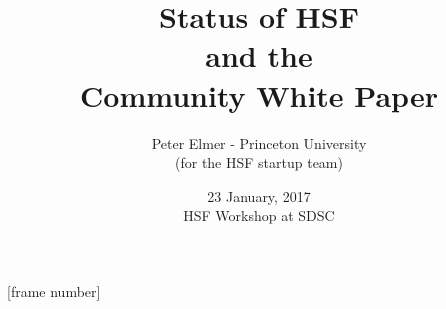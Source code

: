 \documentclass{beamer}
\title{Status of HSF \\
       and the \\
     Community White Paper}
\author{Peter Elmer - Princeton University \\
        (for the HSF startup team)}
\date{23 January, 2017 \\ HSF Workshop at SDSC}
\begin{document}
\maketitle

%
%

[frame number]





















%








%

%
%



%












%
%
%
\end{document}

